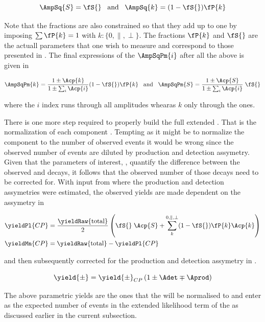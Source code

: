 \begin{equation}
\AmpSq{S} = \fS{} \;\;\;\text{and}\;\;\; \AmpSq{k} = (1-\fS{})\fP{k}
\label{amps_param}
\end{equation}

Note that the \pwave fractions are also constrained so that they add up to one by imposing $\sum\fP{k}=1$ with $k:\{0,\parallel,\perp\}$.
The fractions $\fP{k}$ and $\fS{}$ are the actuall parameters that one wish to measure and correspond to those presented in .
The final expressions of the $\AmpSqPm{i}$ after all the above is given in 

\begin{equation}
\AmpSqPm{k} = \frac{1\pm\Acp{k}}{1\pm\sum_i\Acp{i}}  (1-\fS{})\fP{k}  \;\;\; \text{and}\;\;\; \AmpSqPm{S} = \frac{1\pm\Acp{S}}{1\pm\sum_i\Acp{i}} \; \fS{}
\label{amps_final}
\end{equation}

\noindent where the $i$ index runs through all amplitudes whearas $k$ only through the \pwave ones.

There is one more step required to properly build the full extended \pdf. That is the normalization of each component \pdf. Tempting as it might be to 
normalize the component \pdfs to the number of observed events it would be wrong since the observed number of events are diluted by production and detection
assymetry. Given that the parameters of interest, \ACP, quantify the difference between the observed \BsbarJpsiKst and \BsJpsiKst decays, it follows that
the observed  number of those decays need to be corrected for. With input from  where the production and detection 
assymetries were estimated, the observed yields are made dependent on the \ACP assymetry in  

\begin{align}
\yieldPl{CP} &= \frac{ \yieldRaw{\text{total}} }{2} \left( \fS{}\; \Acp{S} + \sum_k^{0,\parallel,\perp} (1-\fS{})\fP{k}\Acp{k}  \right) \nonumber \\
\yieldMn{CP} &=  \yieldRaw{\text{total}} - \yieldPl{CP} 
\label{acp_yields}
\end{align}

\noindent and then subsequently corrected for the production and detection assymetry in . 

\begin{equation}
\yield{\pm} = \yield{\pm}_{CP}  \left( 1 \pm \Adet \mp \Aprod \right)
\label{norm_yields}
\end{equation}

\noindent The above parametric yields are the ones that the \pdfs will be normalised to and enter as the expected number of events in the extended
likelihood term of the \pdfs as discussed earlier in the current subsection. 
